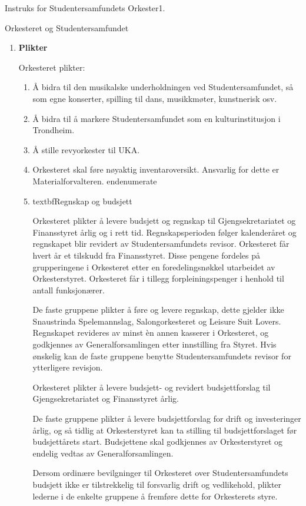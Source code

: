 \begin{instruks}{Instruks for Studentersamfundets Orkester}{1. }{ }
\begin{instruksledd}{Orkesteret og Studentersamfundet}
\begin{enumerate}
Medlemmene av Orkesterstyret som har både tale- og stemmerett er funksjonærer ved Studentersamfundet
i
Trondhjem.

        \item \textbf{Plikter}

Orkesteret plikter:

        \begin{enumerate}
        \item Å bidra til den musikalske underholdningen ved Studentersamfundet, så som egne
konserter, spilling til
dans, musikkmøter, kunstnerisk osv.
        \item Å bidra til å markere Studentersamfundet som en kulturinstitusjon i Trondheim.
        \item Å stille revyorkester til UKA.
        \item Orkesteret skal føre nøyaktig inventaroversikt. Ansvarlig for dette er
Materialforvalteren.
        end{enumerate}

        \item textbf{Regnskap og budsjett}

Orkesteret plikter å levere budsjett og regnskap til Gjengsekretariatet og Finansstyret årlig og i
rett tid.
Regnskapsperioden følger kalenderåret og regnskapet blir revidert av Studentersamfundets revisor.
Orkesteret får hvert år et tilskudd fra Finansstyret. Disse pengene fordeles på grupperingene i
Orkesteret etter
en foredelingsnøkkel utarbeidet av Orkesterstyret. Orkesteret får i tillegg forpleiningspenger i
henhold til
antall funksjonærer.

De faste gruppene plikter å føre og levere regnskap, dette gjelder ikke Snaustrinda
Spelemannslag, Salongorkesteret og Leisure Suit Lovers. Regnskapet revideres av minst èn annen
kasserer i
Orkesteret, og godkjennes av Generalforsamlingen etter innstilling fra Styret. Hvis ønskelig kan de
faste
gruppene benytte Studentersamfundets revisor for ytterligere revisjon.

Orkesteret plikter å levere budsjett- og revidert budsjettforslag til Gjengsekretariatet og
Finansstyret årlig.

De faste gruppene plikter å levere budsjettforslag for drift og investeringer årlig, og så tidlig at
Orkesterstyret
kan ta stilling til budsjettforslaget før budsjettårets start. Budsjettene skal godkjennes av
Orkesterstyret og
endelig vedtas av Generalforsamlingen.

Dersom ordinære bevilgninger til Orkesteret over Studentersamfundets budsjett ikke er tilstrekkelig
til
forsvarlig drift og vedlikehold, plikter lederne i de enkelte gruppene å fremføre dette for
Orkesterets styre.


\end{enumerate}
\end{enumerate}
\end{instruksledd}
\end{instruks}

